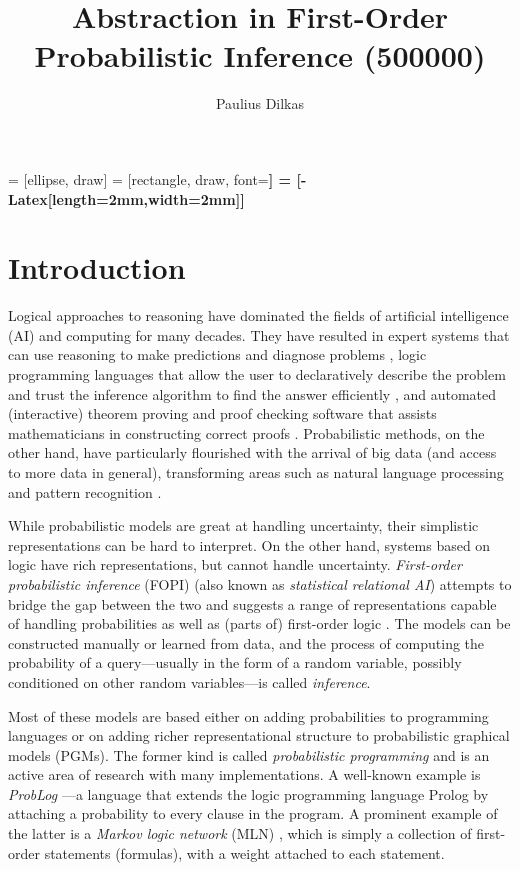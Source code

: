 \documentclass{article}
\begin{document}
\title{Abstraction in First-Order Probabilistic Inference (500000)}
\author{Paulius Dilkas}
\maketitle

 = [ellipse, draw]
 = [rectangle, draw, font=\bfseries]
 = [-{Latex[length=2mm,width=2mm]}]

\section{Introduction}

Logical approaches to reasoning have dominated the fields of artificial
intelligence (AI) and computing for many decades. They have resulted in expert
systems that can use reasoning to make predictions and diagnose problems
\cite{hayes1983building}, logic programming languages that allow the user to
declaratively describe the problem and trust the inference algorithm to find the
answer efficiently \cite{DBLP:books/sp/Lloyd87}, and automated (interactive)
theorem proving and proof checking software that assists mathematicians in
constructing correct proofs \cite{DBLP:books/el/RobinsonV01}. Probabilistic
methods, on the other hand, have particularly flourished with the arrival of big
data (and access to more data in general), transforming areas such as natural
language processing and pattern recognition \cite{DBLP:series/sci/BrazAR08}.

While probabilistic models are great at handling uncertainty, their
simplistic representations can be hard to interpret. On the other hand, systems
based on logic have rich representations, but cannot handle uncertainty.
\emph{First-order probabilistic inference} (FOPI) (also known as
\emph{statistical relational AI}) attempts to bridge the gap
between the two and suggests a range of representations capable of handling probabilities as well as (parts of)
first-order logic \cite{DBLP:series/sci/BrazAR08}. The models can be constructed
manually or learned from data, and the process of computing the probability of a
query---usually in the form of a random variable, possibly conditioned on other
random variables---is called \emph{inference}.

Most of these models are based either on adding probabilities to programming
languages or on adding richer representational structure to probabilistic
graphical models (PGMs). The former kind is called \emph{probabilistic
  programming} \cite{DBLP:conf/icse/GordonHNR14} and is an active area of
research with many implementations. A well-known example is \emph{ProbLog}
\cite{DBLP:conf/ijcai/RaedtKT07}---a language that extends the logic programming
language Prolog by attaching a probability to every clause in the program. A
prominent example of the latter is a \emph{Markov logic network} (MLN)
\cite{DBLP:journals/ml/RichardsonD06}, which is simply a collection of
first-order statements (formulas), with a weight attached to each statement.
\end{document}
